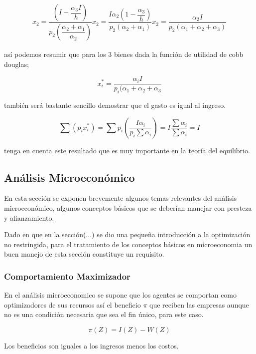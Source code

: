 \documentclass[12pt]{article}
\begin{document}
\begin{eqnarray}


x_{2}= \dfrac{  (I-\dfrac{\alpha_{3}I}{h})}{p_{2}(\dfrac{\alpha_{2} + \alpha_{1}}{\alpha_{2}})}

x_{2} = \dfrac{ I \alpha_{2}(1-\dfrac{\alpha_{3}}{h})}{p_{2}( \alpha_{2}+\alpha_{1})}

x_{2}=\dfrac{\alpha_{2}I}{p_{2}(\alpha_{1}+\alpha_{2}+\alpha_{3})}


\end{eqnarray}

así podemos resumir que para los 3 bienes dada la función de utilidad de cobb douglas; 

$$x_{i}^{*}=\dfrac{\alpha_{i}I}{p_{i}(\alpha_{1}+\alpha_{2}+\alpha_{3}}$$

también será bastante sencillo demostrar que el gasto es igual al ingreso.


$$ \sum(p_{i}x_{i}^{*})=\sum p_{i}(\dfrac{I \alpha_{i}}{p_{i}\sum\alpha_{i} }) = I \dfrac{\sum \alpha_{i}}{\sum \alpha_{i}}=I $$


tenga en cuenta este resultado que es muy importante en la teoría del equilibrio.




\subsection*{Análisis Microeconómico}

En esta sección se exponen brevemente algunos temas relevantes del análisis microeconómico, algunos conceptos básicos que se deberían manejar con presteza  y afianzamiento.

Dado en que en la sección(...) se dio una pequeña introducción a la optimización no restringida, para el tratamiento de los conceptos básicos en microeconomia un buen manejo de esta sección constituye un requisito.

\subsubsection*{Comportamiento Maximizador}

En el análisis microeconomico se supone que los agentes se comportan como optimizadores de sus recursos así el beneficio $\pi$ que reciben las empresas aunque no es una condición necesaria que sea el fin único, para este caso.


$$\pi(Z)=I(Z)-W(Z)$$

Los beneficios son iguales a los ingresos menos los costos.
\end{document}
